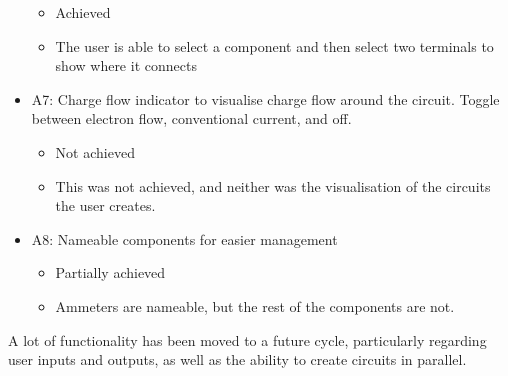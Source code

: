 \begin{itemize}
        \begin{itemize}
            \item Achieved
            \item The user is able to select a component and then select two terminals to show where it connects
        \end{itemize}
        \item A7: Charge flow indicator to visualise charge flow around the circuit. Toggle between electron flow, conventional current, and off. 
        \begin{itemize}
            \item Not achieved
            \item This was not achieved, and neither was the visualisation of the circuits the user creates. 
        \end{itemize}
        \item A8: Nameable components for easier management
        \begin{itemize}
            \item Partially achieved
            \item Ammeters are nameable, but the rest of the components are not. 
        \end{itemize}
    \end{itemize}

    A lot of functionality has been moved to a future cycle, particularly regarding user inputs and outputs, as well as the ability to create circuits in parallel. 


